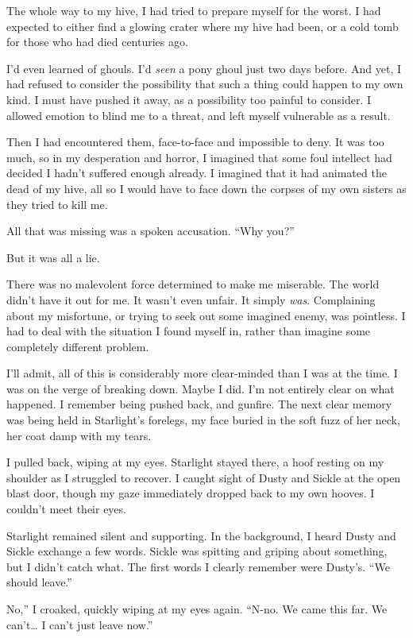 The whole way to my hive, I had tried to prepare myself for the worst. I had expected to either find a glowing crater where my hive had been, or a cold tomb for those who had died centuries ago.

I’d even learned of ghouls. I’d \textit{seen} a pony ghoul just two days before. And yet, I had refused to consider the possibility that such a thing could happen to my own kind. I must have pushed it away, as a possibility too painful to consider. I allowed emotion to blind me to a threat, and left myself vulnerable as a result.

Then I had encountered them, face-to-face and impossible to deny. It was too much, so in my desperation and horror, I imagined that some foul intellect had decided I hadn’t suffered enough already. I imagined that it had animated the dead of my hive, all so I would have to face down the corpses of my own sisters as they tried to kill me.

All that was missing was a spoken accusation. “Why you?”

But it was all a lie.

There was no malevolent force determined to make me miserable. The world didn’t have it out for me. It wasn’t even unfair. It simply \textit{was}. Complaining about my misfortune, or trying to seek out some imagined enemy, was pointless. I had to deal with the situation I found myself in, rather than imagine some completely different problem.

I’ll admit, all of this is considerably more clear-minded than I was at the time. I was on the verge of breaking down. Maybe I did. I’m not entirely clear on what happened. I remember being pushed back, and gunfire. The next clear memory was being held in Starlight’s forelegs, my face buried in the soft fuzz of her neck, her coat damp with my tears.

I pulled back, wiping at my eyes. Starlight stayed there, a hoof resting on my shoulder as I struggled to recover. I caught sight of Dusty and Sickle at the open blast door, though my gaze immediately dropped back to my own hooves. I couldn’t meet their eyes.

Starlight remained silent and supporting. In the background, I heard Dusty and Sickle exchange a few words. Sickle was spitting and griping about something, but I didn’t catch what. The first words I clearly remember were Dusty’s. “We should leave.”

\leavevmode{}No,” I croaked, quickly wiping at my eyes again. “N-no. We came this far. We can’t… I can’t just leave now.”


